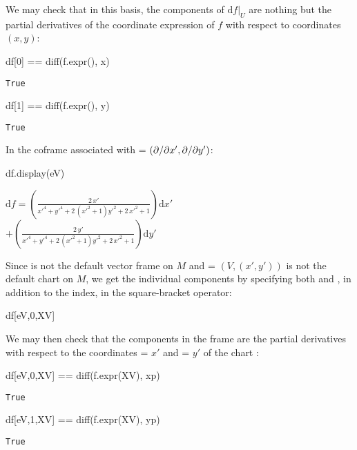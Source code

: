 We may check that in this basis, the components of $\left. \mathrm{d}f \right| _U$
are nothing but the partial derivatives of the coordinate expression of $f$
with respect to coordinates $(x,y)$:
\begin{NBin}
df[0] == diff(f.expr(), x)
\end{NBin}
\begin{NBout}
\texttt{True}
\end{NBout}
\begin{NBin}
df[1] == diff(f.expr(), y)
\end{NBin}
\begin{NBout}
\texttt{True}
\end{NBout}
In the coframe associated with  = $({\partial }/{\partial x'},{\partial }/{\partial y'})$:
\begin{NBin}
df.display(eV)
\end{NBin}
\begin{NBout}
$\displaystyle
\mathrm{d}f = \left( \frac{2 \, {x'}}{{x'}^{4} + {y'}^{4} + 2 \, {\left({x'}^{2} + 1\right)} {y'}^{2} + 2 \, {x'}^{2} + 1} \right) \mathrm{d} {x'} $\\
$\displaystyle
+ \left( \frac{2 \, {y'}}{{x'}^{4} + {y'}^{4} + 2 \, {\left({x'}^{2} + 1\right)} {y'}^{2} + 2 \, {x'}^{2} + 1} \right) \mathrm{d} {y'}$
\end{NBout}
Since  is not the default vector frame on $M$ and  = $(V,(x',y'))$
is not the default chart on $M$, we get the individual components by
specifying both  and , in addition to the index, in the
square-bracket operator:
\begin{NBin}
df[eV,0,XV]
\end{NBin}
\begin{NBoutM}
\end{NBoutM}
We may then check that the components in the frame 
are the partial derivatives with respect to the coordinates  = $x'$ and
 = $y'$ of the chart :
\begin{NBin}
df[eV,0,XV] == diff(f.expr(XV), xp)
\end{NBin}
\begin{NBout}
\texttt{True}
\end{NBout}
\begin{NBin}
df[eV,1,XV] == diff(f.expr(XV), yp)
\end{NBin}
\begin{NBout}
\texttt{True}
\end{NBout}

